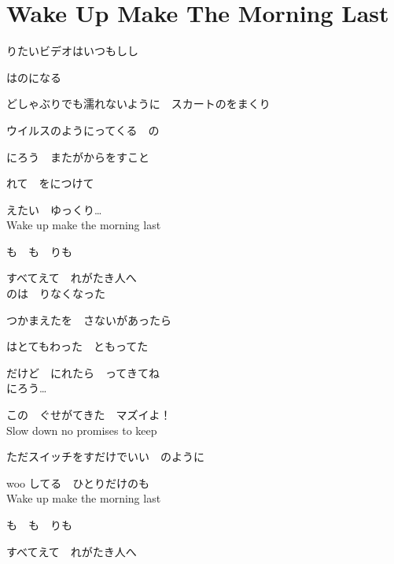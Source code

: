\section{ Wake Up Make The Morning Last}
\large{

りたいビデオはいつもしし

はのになる

どしゃぶりでも濡れないように　スカートのをまくり

ウイルスのようにってくる　の

にろう　またがからをすこと

れて　をにつけて

えたい　ゆっくり…
\\

Wake up make the morning last

も　も　りも

すべてえて　れがたき人へ
\\

のは　りなくなった

つかまえたを　さないがあったら

はとてもわった　ともってた

だけど　にれたら　ってきてね
\\

にろう…

この　ぐせがてきた　マズイよ！
\\

Slow down no promises to keep

ただスイッチをすだけでいい　のように

woo してる　ひとりだけのも
\\

Wake up make the morning last

も　も　りも

すべてえて　れがたき人へ
\\

}